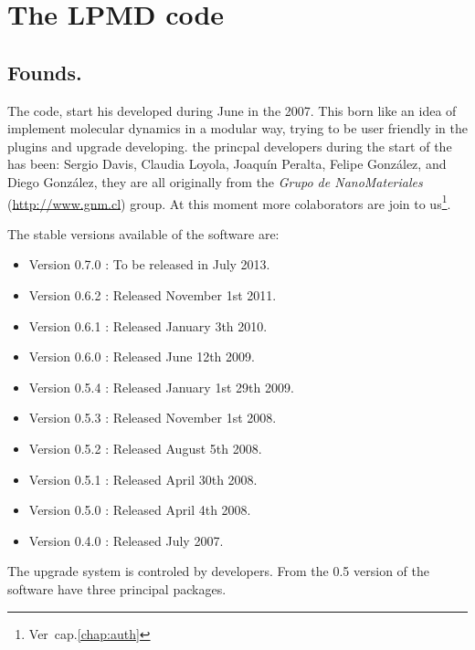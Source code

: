 \chapter{The LPMD code}
\label{chap:lpmd}

\section{Founds.}

The {\lpmd} code, start his developed during June in the 2007. This born like
an idea of implement molecular dynamics in a modular way, trying to be
user friendly  in the plugins and upgrade developing. the princpal developers
during the start of the has been: Sergio Davis, Claudia Loyola, Joaqu\'in
Peralta, Felipe Gonz\'alez, and Diego Gonz\'alez, they are all originally from the \textit{Grupo de
NanoMateriales} (\url{http://www.gnm.cl}) group. At this moment more
colaborators are join to us\footnote{Ver~cap.\ref{chap:auth}}.

The stable versions available of the software are:

\begin{itemize}
 \item Version 0.7.0 : To be released in July 2013.
 \item Version 0.6.2 : Released November 1st 2011.
 \item Version 0.6.1 : Released January 3th 2010.
 \item Version 0.6.0 : Released June 12th 2009.
 \item Version 0.5.4 : Released January 1st 29th 2009.
 \item Version 0.5.3 : Released November 1st 2008.
 \item Version 0.5.2 : Released August 5th 2008.
 \item Version 0.5.1 : Released April 30th 2008.
 \item Version 0.5.0 : Released April 4th 2008.
 \item Version 0.4.0 : Released July 2007.
\end{itemize}

The upgrade system is controled by developers. From the 0.5 version of {\lpmd}
the software have three principal packages.


